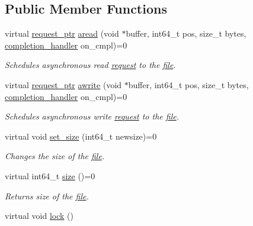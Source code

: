 \subsection*{Public Member Functions}
\begin{CompactItemize}
\item 
virtual \hyperlink{classrequest__ptr}{request\_\-ptr} \hyperlink{group__iolayer_gccc17bdde11461510dce18cefec5d207}{aread} (void $\ast$buffer, int64\_\-t pos, size\_\-t bytes, \hyperlink{classcompletion__handler}{completion\_\-handler} on\_\-cmpl)=0
\begin{CompactList}\small\item\em Schedules asynchronous read \hyperlink{classrequest}{request} to the \hyperlink{classfile}{file}. \item\end{CompactList}\item 
virtual \hyperlink{classrequest__ptr}{request\_\-ptr} \hyperlink{group__iolayer_g5c15b0b96abcfc0b06bb906afbf1dd2b}{awrite} (void $\ast$buffer, int64\_\-t pos, size\_\-t bytes, \hyperlink{classcompletion__handler}{completion\_\-handler} on\_\-cmpl)=0
\begin{CompactList}\small\item\em Schedules asynchronous write \hyperlink{classrequest}{request} to the \hyperlink{classfile}{file}. \item\end{CompactList}\item 
virtual void \hyperlink{group__iolayer_g0388ba482ccd9be978edef3d54e2e41c}{set\_\-size} (int64\_\-t newsize)=0
\begin{CompactList}\small\item\em Changes the size of the \hyperlink{classfile}{file}. \item\end{CompactList}\item 
virtual int64\_\-t \hyperlink{group__iolayer_g452fdcecf86299ffda1aba728a28c98d}{size} ()=0
\begin{CompactList}\small\item\em Returns size of the \hyperlink{classfile}{file}. \item\end{CompactList}\item 
\hypertarget{group__iolayer_g27be6a3162808bae88906d6f7b383fff}{
virtual void \hyperlink{group__iolayer_g27be6a3162808bae88906d6f7b383fff}{lock} ()}
\label{group__iolayer_g27be6a3162808bae88906d6f7b383fff}


\end{CompactItemize}
